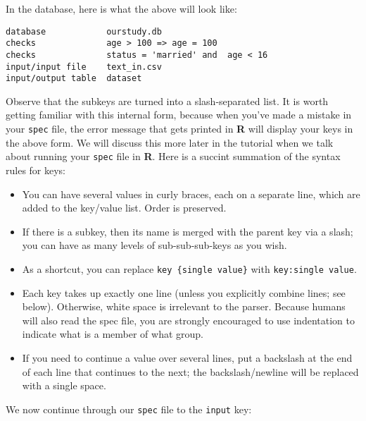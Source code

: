 \documentclass{article}
\begin{document}
In the database, here is what the above will look like:
\begin{verbatim}
database            ourstudy.db
checks              age > 100 => age = 100
checks              status = 'married' and  age < 16
input/input file    text_in.csv
input/output table  dataset
\end{verbatim}

Observe that the subkeys are turned into a slash-separated list. It is 
worth getting familiar with this internal form, because when you've made a 
mistake in your {\tt spec} file, the error message that gets printed in \textbf{R} 
will display your keys in the above form. We will discuss this more later in the 
tutorial when we talk about running your {\tt spec} file in \textbf{R}.
Here is a succint summation of the syntax rules for keys:

\begin{itemize}
\item You can have several values in curly braces, each on a separate line, which are added to the key/value list. Order is preserved.
\item If there is a subkey, then its name is merged with the parent key via a slash;
you can have as many levels of sub-sub-sub-keys as you wish.
\item As a shortcut, you can replace {\tt key \{single value\}} with {\tt key:single value}.
\item Each key takes up exactly one line (unless you explicitly combine lines; see below). Otherwise, white
space is irrelevant to the parser. Because humans will also read the spec file, you
are strongly encouraged to use indentation to indicate what is a member of what group.
\item If you need to continue a value over several lines, put a backslash at the end of
each line that continues to the next; the backslash/newline will be replaced with a single space.
\end{itemize}

We now continue through our {\tt spec} file to the {\tt input} key:
\end{document}
